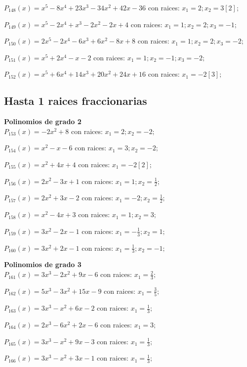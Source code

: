 \subitem $P_{148}(x) = x^5 - 8x^4 + 23x^3 - 34x^2 + 42x - 36$ con raices: $x_1 = 2 ; x_2 = 3[2] ;  $

\subitem $P_{149}(x) = x^5 - 2x^4 + x^3 - 2x^2 - 2x + 4$ con raices: $x_1 = 1 ; x_2 = 2 ; x_3 = -1 ;  $

\subitem $P_{150}(x) = 2x^5 - 2x^4 - 6x^3 + 6x^2 - 8x + 8$ con raices: $x_1 = 1 ; x_2 = 2 ; x_3 = -2 ;  $

\subitem $P_{151}(x) = x^5 + 2x^4 - x - 2$ con raices: $x_1 = 1 ; x_2 = -1 ; x_3 = -2 ;  $

\subitem $P_{152}(x) = x^5 + 6x^4 + 14x^3 + 20x^2 + 24x + 16$ con raices: $x_1 = -2[3] ;  $

\subsection{Hasta 1 raices fraccionarias}
\textbf{Polinomios de grado 2\\} 
\subitem $P_{153}(x) = -2x^2 + 8$ con raices: $x_1 = 2 ; x_2 = -2 ;  $

\subitem $P_{154}(x) = x^2 - x - 6$ con raices: $x_1 = 3 ; x_2 = -2 ;  $

\subitem $P_{155}(x) = x^2 + 4x + 4$ con raices: $x_1 = -2[2] ;  $

\subitem $P_{156}(x) = 2x^2 - 3x + 1$ con raices: $x_1 = 1 ; x_2 = \frac{1}{2} ;  $

\subitem $P_{157}(x) = 2x^2 + 3x - 2$ con raices: $x_1 = -2 ; x_2 = \frac{1}{2} ;  $

\subitem $P_{158}(x) = x^2 - 4x + 3$ con raices: $x_1 = 1 ; x_2 = 3 ;  $

\subitem $P_{159}(x) = 3x^2 - 2x - 1$ con raices: $x_1 = -\frac{1}{3} ; x_2 = 1 ;  $

\subitem $P_{160}(x) = 3x^2 + 2x - 1$ con raices: $x_1 = \frac{1}{3} ; x_2 = -1 ;  $

\textbf{Polinomios de grado 3\\} 
\subitem $P_{161}(x) = 3x^3 - 2x^2 + 9x - 6$ con raices: $x_1 = \frac{2}{3} ;  $

\subitem $P_{162}(x) = 5x^3 - 3x^2 + 15x - 9$ con raices: $x_1 = \frac{3}{5} ;  $

\subitem $P_{163}(x) = 3x^3 - x^2 + 6x - 2$ con raices: $x_1 = \frac{1}{3} ;  $

\subitem $P_{164}(x) = 2x^3 - 6x^2 + 2x - 6$ con raices: $x_1 = 3 ;  $

\subitem $P_{165}(x) = 3x^3 - x^2 + 9x - 3$ con raices: $x_1 = \frac{1}{3} ;  $

\subitem $P_{166}(x) = 3x^3 - x^2 + 3x - 1$ con raices: $x_1 = \frac{1}{3} ;  $

